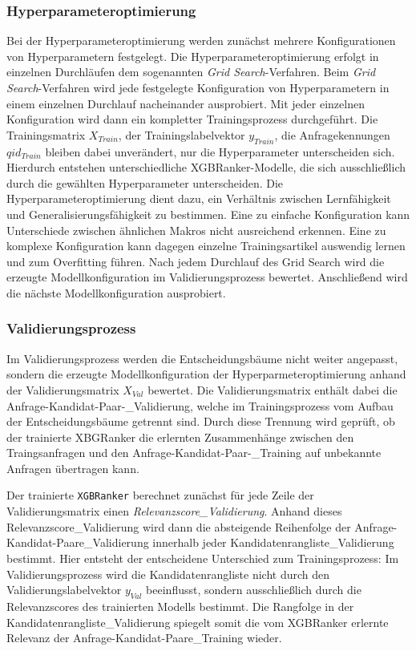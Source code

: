 
\subsubsection{Hyperparameteroptimierung} 

Bei der Hyperparameteroptimierung werden zunächst mehrere Konfigurationen von Hyperparametern festgelegt. Die Hyperparameteroptimierung erfolgt in einzelnen Durchläufen dem sogenannten \textit{Grid Search}-Verfahren.
Beim \textit{Grid Search}-Verfahren wird jede festgelegte Konfiguration von Hyperparametern in einem einzelnen Durchlauf nacheinander ausprobiert.
Mit jeder einzelnen Konfiguration wird dann ein kompletter Trainingsprozess durchgeführt. Die Trainingsmatrix \(X_{Train}\), der Trainingslabelvektor \(y_{Train}\), die Anfragekennungen \(qid_{Train}\) bleiben dabei unverändert, 
nur die Hyperparameter unterscheiden sich. Hierdurch entstehen unterschiedliche XGBRanker-Modelle, die sich ausschließlich durch die gewählten Hyperparameter unterscheiden.
Die Hyperparameteroptimierung dient dazu, ein Verhältnis zwischen Lernfähigkeit und Generalisierungsfähigkeit zu bestimmen. Eine zu einfache Konfiguration kann Unterschiede zwischen ähnlichen Makros nicht ausreichend erkennen. 
Eine zu komplexe Konfiguration kann dagegen einzelne Trainingsartikel auswendig lernen und zum Overfitting führen. 
Nach jedem Durchlauf des Grid Search wird die erzeugte Modellkonfiguration im Validierungsprozess bewertet. Anschließend wird die nächste Modellkonfiguration ausprobiert.

\subsubsection{Validierungsprozess} 
\label{sec:validierungsprozess}

Im Validierungsprozess werden die Entscheidungsbäume nicht weiter angepasst, sondern die erzeugte Modellkonfiguration der Hyperparmeteroptimierung anhand der Validierungsmatrix \(X_{Val}\) bewertet.
Die Validierungsmatrix enthält dabei die Anfrage-Kandidat-Paar-\_Validierung, welche im Trainingsprozess vom Aufbau der Entscheidungsbäume getrennt sind.
Durch diese Trennung wird geprüft, ob der trainierte XBGRanker die erlernten Zusammenhänge zwischen den Traingsanfragen und den Anfrage-Kandidat-Paar-\_Training auf unbekannte Anfragen übertragen kann.

Der trainierte \texttt{XGBRanker} berechnet zunächst für jede Zeile der Validierungsmatrix einen \textit{Relevanzscore\_Validierung}.
Anhand dieses Relevanzscore\_Validierung wird dann die absteigende Reihenfolge der Anfrage-Kandidat-Paare\_Validierung innerhalb jeder Kandidatenrangliste\_Validierung bestimmt.
Hier entsteht der entscheidene Unterschied zum Trainingsprozess: Im Validierungsprozess wird die Kandidatenrangliste nicht durch den Validierungslabelvektor \(y_{Val}\) beeinflusst, 
sondern ausschließlich durch die Relevanzscores des trainierten Modells bestimmt. Die Rangfolge in der Kandidatenrangliste\_Validierung spiegelt somit die vom XGBRanker erlernte Relevanz der Anfrage-Kandidat-Paare\_Training wieder.

